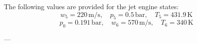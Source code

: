 The following values are provided for the jet engine states:  
\[
w_5 = 220 \, \text{m/s}, \quad p_5 = 0.5 \, \text{bar}, \quad T_5 = 431.9 \, \text{K}
\]
\[
p_0 = 0.191 \, \text{bar}, \quad w_6 = 570 \, \text{m/s}, \quad T_6 = 340 \, \text{K}
\]

---